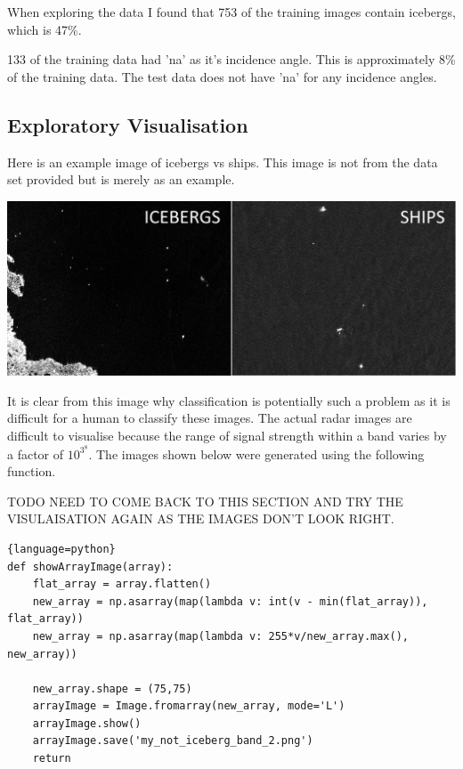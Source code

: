 \documentclass{article}
\begin{document}
When exploring the data I found that 753 of the training images contain icebergs, which is 47\%. 

133 of the training data had 'na' as it's incidence angle. This is approximately 8\% of the training data. The test data does not have 'na' for any incidence angles.  
\subsection{Exploratory Visualisation}
Here is an example image of icebergs vs ships. This image is not from the data set provided but is merely as an example.

\includegraphics[scale=0.125]{ship-iceberg}

\cite{kaggle}
It is clear from this image why classification is potentially such a problem as it is difficult for a human to classify these images. The actual radar images are difficult to visualise because the range of signal strength within a band varies by a factor of $10^3^8$. The images shown below were generated using the following function.

TODO NEED TO COME BACK TO THIS SECTION AND TRY THE VISULAISATION AGAIN AS THE IMAGES DON'T LOOK RIGHT. 
\begin{lstlisting}{language=python}
def showArrayImage(array):
    flat_array = array.flatten()
    new_array = np.asarray(map(lambda v: int(v - min(flat_array)), flat_array))
    new_array = np.asarray(map(lambda v: 255*v/new_array.max(), new_array))

    new_array.shape = (75,75)
    arrayImage = Image.fromarray(new_array, mode='L')
    arrayImage.show()
    arrayImage.save('my_not_iceberg_band_2.png')
    return
\end{lstlisting}
\end{document}
